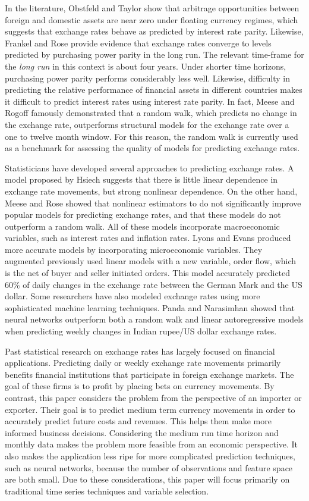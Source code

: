 \documentclass{sig-alternate-05-2015}
\begin{document}
\par{} In the literature, Obstfeld and Taylor show that arbitrage opportunities between foreign and domestic assets are near zero under floating currency regimes, which suggests that exchange rates behave as predicted by interest rate parity. Likewise, Frankel and Rose provide evidence that exchange rates converge to levels predicted by purchasing power parity in the long run. The relevant time-frame for the \emph{long run} in this context is about four years. Under shorter time horizons, purchasing power parity performs considerably less well. Likewise, difficulty in predicting the relative performance of financial assets in different countries makes it difficult to predict interest rates using interest rate parity. In fact, Meese and Rogoff famously demonstrated that a random walk, which predicts no change in the exchange rate, outperforms structural models for the exchange rate over a one to twelve month window. For this reason, the random walk is currently used as a benchmark for assessing the quality of models for predicting exchange rates.
\par{} Statisticians have developed several approaches to predicting exchange rates. A model proposed by Hsiech suggests that there is little linear dependence in exchange rate movements, but strong nonlinear dependence. On the other hand, Meese and Rose showed that nonlinear estimators to do not significantly improve popular models for predicting exchange rates, and that these models do not outperform a random walk. All of these models incorporate macroeconomic variables, such as interest rates and inflation rates. Lyons and Evans produced more accurate models by incorporating microeconomic variables. They augmented previously used linear models with a new variable, order flow, which is the net of buyer and seller initiated orders. This model accurately predicted 60\% of daily changes in the exchange rate between the German Mark and the US dollar. Some researchers have also modeled exchange rates using more sophisticated machine learning techniques. Panda and Narasimhan showed that neural networks outperform both a random walk and linear autoregressive models when predicting weekly changes in Indian rupee/US dollar exchange rates.
\par{} Past statistical research on exchange rates has largely focused on financial applications. Predicting daily or weekly exchange rate movements primarily benefits financial institutions that participate in foreign exchange markets. The goal of these firms is to profit by placing bets on currency movements. By contrast, this paper considers the problem from the perspective of an importer or exporter. Their goal is to predict medium term currency movements in order to accurately predict future costs and revenues. This helps them make more informed business decisions. Considering the medium run time horizon and monthly data makes the problem more feasible from an economic perspective. It also makes the application less ripe for more complicated prediction techniques, such as neural networks, because the number of observations and feature space are both small. Due to these considerations, this paper will focus primarily on traditional time series techniques and variable selection.
\end{document}
